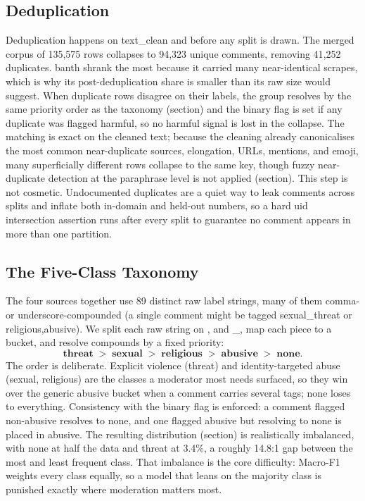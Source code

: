 \documentclass[11pt,a4paper]{article}
\def\dset#1{#1}%
\def\cref#1{section}%
\def\texttt#1{#1}%
\def\textsc#1{#1}%
\def\emph#1{#1}%
\providecommand{\dset}[1]{\textsc{#1}}
\begin{document}
\subsection{Deduplication}
\label{sec:dedup}

Deduplication happens on \texttt{text\_clean} and before any split is drawn. The merged corpus of 135{,}575 rows collapses to 94{,}323 unique comments, removing 41{,}252 duplicates. \dset{banth} shrank the most because it carried many near-identical scrapes, which is why its post-deduplication share is smaller than its raw size would suggest. When duplicate rows disagree on their labels, the group resolves by the same priority order as the taxonomy (\cref{eq:priority}) and the binary flag is set if any duplicate was flagged harmful, so no harmful signal is lost in the collapse. The matching is exact on the cleaned text; because the cleaning already canonicalises the most common near-duplicate sources, elongation, URLs, mentions, and emoji, many superficially different rows collapse to the same key, though fuzzy near-duplicate detection at the paraphrase level is not applied (\cref{sec:limitations}). This step is not cosmetic. Undocumented duplicates are a quiet way to leak comments across splits and inflate both in-domain and held-out numbers, so a hard \texttt{uid} intersection assertion runs after every split to guarantee no comment appears in more than one partition.

\subsection{The Five-Class Taxonomy}
\label{sec:taxonomy}

The four sources together use 89 distinct raw label strings, many of them comma- or underscore-compounded (a single comment might be tagged \texttt{sexual\_threat} or \texttt{religious,abusive}). We split each raw string on \texttt{,} and \texttt{\_}, map each piece to a bucket, and resolve compounds by a fixed priority:
\begin{equation}
\textbf{threat} \;>\; \textbf{sexual} \;>\; \textbf{religious} \;>\; \textbf{abusive} \;>\; \textbf{none}.
\label{eq:priority}
\end{equation}
The order is deliberate. Explicit violence (\emph{threat}) and identity-targeted abuse (\emph{sexual}, \emph{religious}) are the classes a moderator most needs surfaced, so they win over the generic \emph{abusive} bucket when a comment carries several tags; \emph{none} loses to everything. Consistency with the binary flag is enforced: a comment flagged non-abusive resolves to \emph{none}, and one flagged abusive but resolving to \emph{none} is placed in \emph{abusive}. The resulting distribution (\cref{tab:classes}) is realistically imbalanced, with \emph{none} at half the data and \emph{threat} at 3.4\%, a roughly 14.8:1 gap between the most and least frequent class. That imbalance is the core difficulty: Macro-F1 weights every class equally, so a model that leans on the majority class is punished exactly where moderation matters most.
\end{document}
